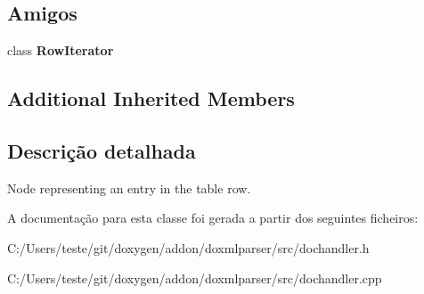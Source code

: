 \subsection*{Amigos}
\begin{DoxyCompactItemize}
\item 
\hypertarget{class_row_handler_a7ab697b5571195fc27a2ad43eac538e1}{class {\bfseries Row\-Iterator}}\label{class_row_handler_a7ab697b5571195fc27a2ad43eac538e1}

\end{DoxyCompactItemize}
\subsection*{Additional Inherited Members}


\subsection{Descrição detalhada}
Node representing an entry in the table row. 



A documentação para esta classe foi gerada a partir dos seguintes ficheiros\-:\begin{DoxyCompactItemize}
\item 
C\-:/\-Users/teste/git/doxygen/addon/doxmlparser/src/dochandler.\-h\item 
C\-:/\-Users/teste/git/doxygen/addon/doxmlparser/src/dochandler.\-cpp\end{DoxyCompactItemize}
